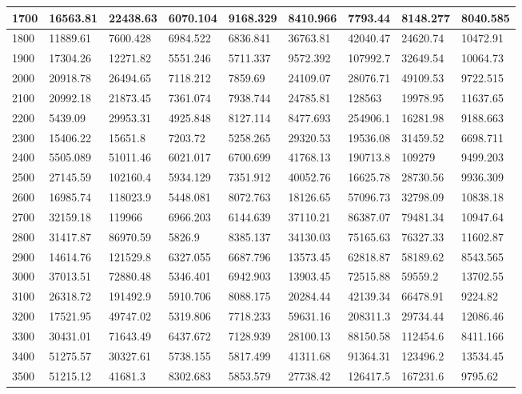 \begin{table}[]
{\begin{tabular}{|l|l|l|l|l|l|l|l|l|}
1700 & 16563.81 & 22438.63 & 6070.104 & 9168.329 & 8410.966 & 7793.44 & 8148.277 & 8040.585 \\ \hline
1800 & 11889.61 & 7600.428 & 6984.522 & 6836.841 & 36763.81 & 42040.47 & 24620.74 & 10472.91 \\ \hline
1900 & 17304.26 & 12271.82 & 5551.246 & 5711.337 & 9572.392 & 107992.7 & 32649.54 & 10064.73 \\ \hline
2000 & 20918.78 & 26494.65 & 7118.212 & 7859.69 & 24109.07 & 28076.71 & 49109.53 & 9722.515 \\ \hline
2100 & 20992.18 & 21873.45 & 7361.074 & 7938.744 & 24785.81 & 128563 & 19978.95 & 11637.65 \\ \hline
2200 & 5439.09 & 29953.31 & 4925.848 & 8127.114 & 8477.693 & 254906.1 & 16281.98 & 9188.663 \\ \hline
2300 & 15406.22 & 15651.8 & 7203.72 & 5258.265 & 29320.53 & 19536.08 & 31459.52 & 6698.711 \\ \hline
2400 & 5505.089 & 51011.46 & 6021.017 & 6700.699 & 41768.13 & 190713.8 & 109279 & 9499.203 \\ \hline
2500 & 27145.59 & 102160.4 & 5934.129 & 7351.912 & 40052.76 & 16625.78 & 28730.56 & 9936.309 \\ \hline
2600 & 16985.74 & 118023.9 & 5448.081 & 8072.763 & 18126.65 & 57096.73 & 32798.09 & 10838.18 \\ \hline
2700 & 32159.18 & 119966 & 6966.203 & 6144.639 & 37110.21 & 86387.07 & 79481.34 & 10947.64 \\ \hline
2800 & 31417.87 & 86970.59 & 5826.9 & 8385.137 & 34130.03 & 75165.63 & 76327.33 & 11602.87 \\ \hline
2900 & 14614.76 & 121529.8 & 6327.055 & 6687.796 & 13573.45 & 62818.87 & 58189.62 & 8543.565 \\ \hline
3000 & 37013.51 & 72880.48 & 5346.401 & 6942.903 & 13903.45 & 72515.88 & 59559.2 & 13702.55 \\ \hline
3100 & 26318.72 & 191492.9 & 5910.706 & 8088.175 & 20284.44 & 42139.34 & 66478.91 & 9224.82 \\ \hline
3200 & 17521.95 & 49747.02 & 5319.806 & 7718.233 & 59631.16 & 208311.3 & 29734.44 & 12086.46 \\ \hline
3300 & 30431.01 & 71643.49 & 6437.672 & 7128.939 & 28100.13 & 88150.58 & 112454.6 & 8411.166 \\ \hline
3400 & 51275.57 & 30327.61 & 5738.155 & 5817.499 & 41311.68 & 91364.31 & 123496.2 & 13534.45 \\ \hline
3500 & 51215.12 & 41681.3 & 8302.683 & 5853.579 & 27738.42 & 126417.5 & 167231.6 & 9795.62 \\ \hline

\end{tabular}}
\end{table}
